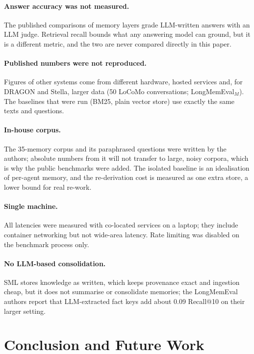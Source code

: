 \documentclass[11pt,a4paper]{article}
\newcommand{\sys}{SML}
\begin{document}
\paragraph{Answer accuracy was not measured.} The published comparisons of memory layers grade LLM-written
answers with an LLM judge. Retrieval recall bounds what any answering model can ground, but it is a different
metric, and the two are never compared directly in this paper.

\paragraph{Published numbers were not reproduced.} Figures of other systems come from different hardware,
hosted services and, for DRAGON and Stella, larger data (50 LoCoMo conversations; LongMemEval$_M$). The
baselines that were run (BM25, plain vector store) use exactly the same texts and questions.

\paragraph{In-house corpus.} The 35-memory corpus and its paraphrased questions were written by the authors;
absolute numbers from it will not transfer to large, noisy corpora, which is why the public benchmarks were
added. The isolated baseline is an idealisation of per-agent memory, and the re-derivation cost is measured as
one extra store, a lower bound for real re-work.

\paragraph{Single machine.} All latencies were measured with co-located services on a laptop; they include
container networking but not wide-area latency. Rate limiting was disabled on the benchmark process only.

\paragraph{No LLM-based consolidation.} \sys{} stores knowledge as written, which keeps provenance exact and
ingestion cheap, but it does not summarise or consolidate memories; the LongMemEval authors report that
LLM-extracted fact keys add about 0.09 Recall@10 on their larger setting.

\section{Conclusion and Future Work}
\label{sec:conclusion}
\end{document}
